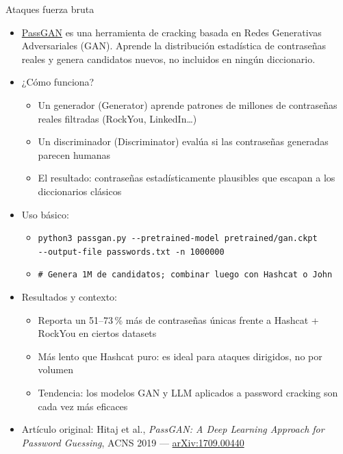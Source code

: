 \documentclass[aspectratio=169,11pt]{beamer}
\newcommand{\cmd}[1]{\texttt{#1}}
\begin{document}
\begin{frame}[allowframebreaks]{Ataques fuerza bruta}
\small
  \begin{itemize}
  \item \href{https://github.com/brannondorsey/PassGAN}{PassGAN} es una herramienta de cracking basada en Redes Generativas Adversariales (GAN). Aprende la distribución estadística de contraseñas reales y genera candidatos nuevos, no incluidos en ningún diccionario.
  \item ¿Cómo funciona?
    \begin{itemize}
  \item Un generador (Generator) aprende patrones de millones de contraseñas reales filtradas (RockYou, LinkedIn\dots{})
  \item Un discriminador (Discriminator) evalúa si las contraseñas generadas parecen humanas
  \item El resultado: contraseñas estadísticamente plausibles que escapan a los diccionarios clásicos
    \end{itemize}
  \item Uso básico:
    \begin{itemize}\scriptsize
    \item \cmd{python3 passgan.py -{}-pretrained-model pretrained/gan.ckpt\\ -{}-output-file passwords.txt -n 1000000}
    \item \cmd{\# Genera 1M de candidatos; combinar luego con Hashcat o John}
    \end{itemize}
  \item Resultados y contexto:
    \begin{itemize}
    \item Reporta un 51--73\,\% más de contraseñas únicas frente a Hashcat + RockYou en ciertos datasets
    \item Más lento que Hashcat puro: es ideal para ataques dirigidos, no por volumen
    \item Tendencia: los modelos GAN y LLM aplicados a password cracking son cada vez más eficaces
    \end{itemize}
  \item Artículo original: Hitaj et al., \emph{PassGAN: A Deep Learning Approach for Password Guessing}, ACNS 2019 --- \href{https://arxiv.org/abs/1709.00440}{arXiv:1709.00440}
  \end{itemize}
\end{frame}
\end{document}
